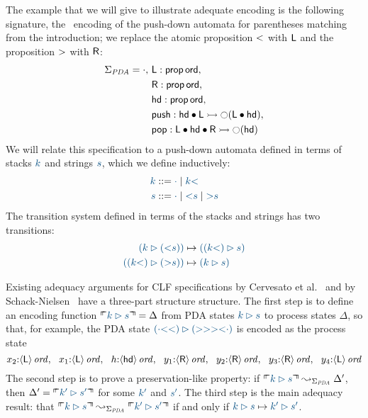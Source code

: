 The example that we will give to illustrate adequate encoding is the
following signature, the \sls~encoding of the push-down automata 
for parentheses matching from the introduction; we replace the atomic
proposition ${\sf <}$ with ${\sf L}$ and the proposition ${\sf >}$ with
${\sf R}$: 
\begin{align*}
 \Sigma_{\it PDA} = \cdot, 
~&{\sf L} : {\sf prop}\,{\sf ord},\\
~&{\sf R} : {\sf prop}\,{\sf ord},\\
~&{\sf hd} : {\sf prop}\,{\sf ord},\\
~&{\sf push} : 
     {\sf hd} \mathbin{\bullet} {\sf L}
       \rightarrowtail {\ocircle}({\sf L} \mathbin{\bullet} {\sf hd}),\\
~&{\sf pop} : 
     {\sf L} \mathbin{\bullet} {\sf hd} \mathbin{\bullet} {\sf R}
       \rightarrowtail {\ocircle}({\sf hd})
\end{align*}
We will relate this specification to a push-down automata defined in
terms of stacks $\obj{k}$ and strings $\obj{s}$, which we define inductively:
\begin{align*}
\obj{k} & ::= \obj{\cdot} \mid \obj{k{\sf <}}\\
\obj{s} & ::= \obj{\cdot} \mid \obj{{\sf <}s} \mid \obj{{\sf >}s}
\end{align*}
The transition system defined in terms of the stacks and strings
has two transitions:
\begin{align*}
\obj{(k
  \rhd ({\sf <}s))} & \mapsto \obj{((k{\sf <}) \rhd s)} \\
\obj{((k{\sf <}) \rhd ({\sf >}s))} & \mapsto \obj{(k \rhd s)}
\end{align*}

Existing adequacy arguments for CLF specifications by Cervesato et
al.~\cite{cervesato02concurrent} and by
Schack-Nielsen~\cite{schacknielsen07induction} have a three-part
structure structure.  The first step is to define an encoding
function $\ctxinterp{k \rhd s} = \Delta$ from PDA states $\obj{k \rhd
  s}$ to process states $\Delta$, so that, for example, the PDA state
$\obj{(\cdot{\sf <<}) \rhd ({\sf >>><}\cdot)}$ is encoded as the
process state
\[
x_2{:}{\langle {\sf L} \rangle}\,{{\it ord}}, ~~
x_1{:}{\langle {\sf L} \rangle}\,{{\it ord}}, ~~
h{:}{\langle {\sf hd} \rangle}\,{{\it ord}}, ~~
y_1{:}{\langle {\sf R} \rangle}\,{{\it ord}}, ~~
y_2{:}{\langle {\sf R} \rangle}\,{{\it ord}}, ~~
y_3{:}{\langle {\sf R} \rangle}\,{{\it ord}}, ~~
y_4{:}{\langle {\sf L} \rangle}\,{{\it ord}}
\]
The second step is to prove a preservation-like property: if
$\ctxinterp{\obj{k \rhd s}} \leadsto_{\Sigma_{\it PDA}}
\Delta'$, then $\Delta' = \ctxinterp{{k' \rhd s'}}$ for some
$\obj{k'}$ and $\obj{s'}$. The third step is the main adequacy result:
that $\ctxinterp{k \rhd s} \leadsto_{\Sigma_{\it PDA}} \ctxinterp{k'
  \rhd s'}$ if and only if $\obj{k \rhd s} \mapsto \obj{k' \rhd
  s'}$. 

